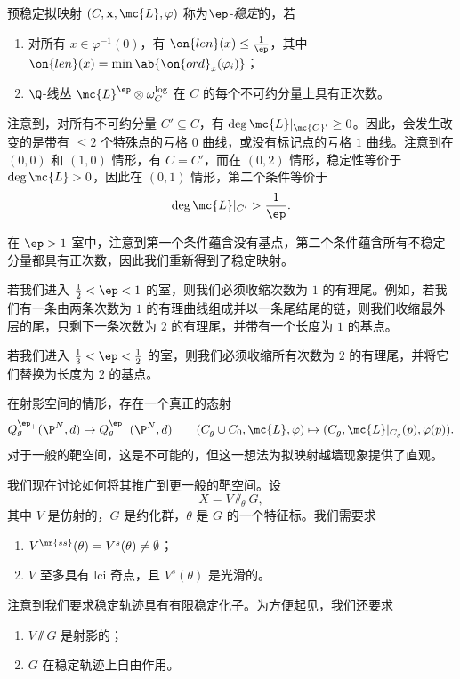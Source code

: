 \begin{defn}
    预稳定拟映射 \((C, \mathbf{x}, \mc{L}, \varphi)\) 称为\textit{\(\ep\)-稳定}的，若
    \begin{enumerate}
        \item 对所有 \(x \in \varphi^{-1}(0)\)，有 \(\on{len}(x) \leq \frac{1}{\ep}\)，其中 \(\on{len}(x) = \min \ab\{ \on{ord}_x (\varphi_i)\}\)；
        \item \(\Q\)-线丛 \(\mc{L}^{\ep} \otimes \omega_C^{\log}\) 在 \(C\) 的每个不可约分量上具有正次数。
    \end{enumerate}
\end{defn}

注意到，对所有不可约分量 \(C' \subseteq C\)，有 \(\deg \mc{L}|_{\mc{C}'} \geq 0\)。因此，会发生改变的是带有 \(\leq 2\) 个特殊点的亏格 \(0\) 曲线，或没有标记点的亏格 \(1\) 曲线。注意到在 \((0,0)\) 和 \((1,0)\) 情形，有 \(C = C'\)，而在 \((0,2)\) 情形，稳定性等价于 \(\deg \mc{L} > 0\)，因此在 \((0,1)\) 情形，第二个条件等价于
\[ \deg \mc{L}|_{C'} > \frac{1}{\ep}. \]

\begin{exm}
    在 \(\ep > 1\) 室中，注意到第一个条件蕴含没有基点，第二个条件蕴含所有不稳定分量都具有正次数，因此我们重新得到了稳定映射。

    若我们进入 \(\frac{1}{2} < \ep < 1\) 的室，则我们必须收缩次数为 \(1\) 的有理尾。例如，若我们有一条由两条次数为 \(1\) 的有理曲线组成并以一条尾结尾的链，则我们收缩最外层的尾，只剩下一条次数为 \(2\) 的有理尾，并带有一个长度为 \(1\) 的基点。

    若我们进入 \(\frac{1}{3} < \ep < \frac{1}{2}\) 的室，则我们必须收缩所有次数为 \(2\) 的有理尾，并将它们替换为长度为 \(2\) 的基点。
\end{exm}

\begin{rmk}
    在射影空间的情形，存在一个真正的态射
    \[ Q_g^{\ep_+}(\P^N, d) \to Q_g^{\ep_-}(\P^N, d) \qquad (C_g \cup C_0, \mc{L}, \varphi) \mapsto (C_g, \mc{L}|_{C_g}(p), \varphi(p)). \]
    对于一般的靶空间，这是不可能的，但这一想法为拟映射越墙现象提供了直观。
\end{rmk}

我们现在讨论如何将其推广到更一般的靶空间。设
\[ X = V \sslash_{\theta} G, \]
其中 \(V\) 是仿射的，\(G\) 是约化群，\(\theta\) 是 \(G\) 的一个特征标。我们需要求
\begin{enumerate}
    \item \(V^{\mr{ss}}(\theta) = V^s(\theta) \neq \emptyset\)；
    \item \(V\) 至多具有 lci 奇点，且 \(V^s(\theta)\) 是光滑的。
\end{enumerate}
注意到我们要求稳定轨迹具有有限稳定化子。为方便起见，我们还要求
\begin{enumerate}
    \item \(V \sslash G\) 是射影的；
    \item \(G\) 在稳定轨迹上自由作用。
\end{enumerate}

